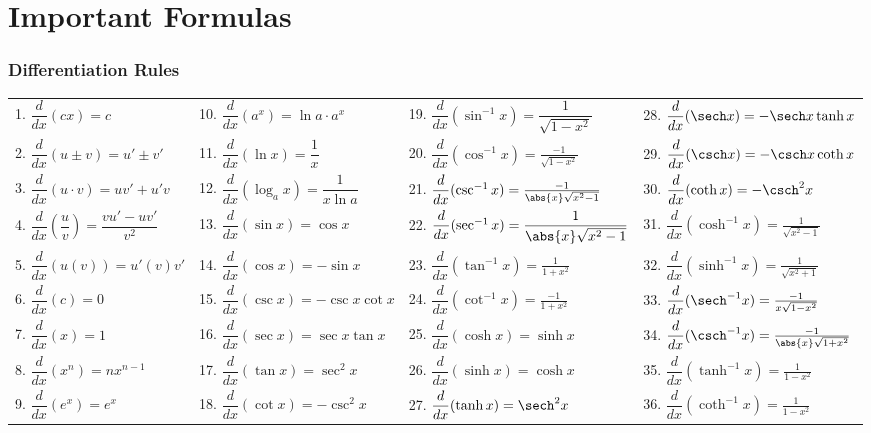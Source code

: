 \pagestyle{empty}

\cleardoublepage

\iflatexml
\chapter*{Important Formulas}
\else
{}
\fi

\subsection{Differentiation Rules}
\bgroup
\footnotesize
\renewcommand{\arraystretch}{2.5}
\noindent\begin{tabular}{llll}
1. $\dfrac d{dx}(cx)=c$ &
10. $\dfrac d{dx}(a^x)=\ln a\cdot a^x$ &
19. $\dfrac d{dx}(\sin^{-1}x)=\dfrac1{\sqrt{1-x^2}}$ &
28. $\dfrac d{dx}(\sech x)=-\sech x\tanh x$ \\
2. $\dfrac d{dx}(u\pm v)=u'\pm v'$ &
11. $\dfrac d{dx}(\ln x)=\dfrac1x$ &
20. $\dfrac d{dx}(\cos^{-1}x)=\frac{-1}{\sqrt{1-x^2}}$ &
29. $\dfrac d{dx}(\csch x)=-\csch x\coth x$ \\
3. $\dfrac d{dx}(u\cdot v)=uv'+u'v$\qquad\null &
12. $\dfrac d{dx}(\log_a x)=\dfrac1{x\ln a}$ &
21. $\dfrac d{dx}(\csc^{-1}x)=\frac{-1}{\abs{x}\sqrt{x^2-1}}$ &
30. $\dfrac d{dx}(\coth x)=-\csch^2 x$ \\
4. $\dfrac d{dx}(\dfrac uv)=\dfrac{vu'-uv'}{v^2}$ &
13. $\dfrac d{dx}(\sin x)=\cos x$ &
22. $\dfrac d{dx}(\sec^{-1}x)=\dfrac1{\abs{x}\sqrt{x^2-1}}$\qquad\null &
31. $\dfrac d{dx}(\cosh^{-1}x)=\frac1{\sqrt{x^2-1}}$ \\
5. $\dfrac d{dx}(u(v))=u'(v)v'$ &
14. $\dfrac d{dx}(\cos x)=-\sin x$ &
23. $\dfrac d{dx}(\tan^{-1}x)=\frac1{1+x^2}$ &
32. $\dfrac d{dx}(\sinh^{-1}x)=\frac1{\sqrt{x^2+1}}$ \\
6. $\dfrac d{dx}(c)=0$ &
15. $\dfrac d{dx}(\csc x)=-\csc x\cot x$\qquad\null &
24. $\dfrac d{dx}(\cot^{-1}x)=\frac{-1}{1+x^2}$ &
33. $\dfrac d{dx}(\sech^{-1}x)=\frac{-1}{x\sqrt{1-x^2}}$ \\
7. $\dfrac d{dx}(x)=1$ &
16. $\dfrac d{dx}(\sec x)=\sec x\tan x$ &
25. $\dfrac d{dx}(\cosh x)=\sinh x$ &
34. $\dfrac d{dx}(\csch^{-1}x)=\frac{-1}{\abs{x}\sqrt{1+x^2}}$ \\
8. $\dfrac d{dx}(x^n)=nx^{n-1}$ &
17. $\dfrac d{dx}(\tan x)=\sec^2x$ &
26. $\dfrac d{dx}(\sinh x)=\cosh x$ &
35. $\dfrac d{dx}(\tanh^{-1}x)=\frac1{1-x^2}$ \\
9. $\dfrac d{dx}(e^x)=e^x$ &
18. $\dfrac d{dx}(\cot x)=-\csc^2x$ &
27. $\dfrac d{dx}(\tanh x)=\sech^2x$ &
36. $\dfrac d{dx}(\coth^{-1}x)=\frac1{1-x^2}$
\end{tabular}

